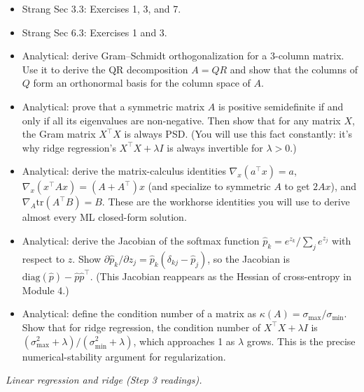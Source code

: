 \begin{itemize}
\tightlist
\item
  Strang Sec 3.3: Exercises 1, 3, and 7.
\item
  Strang Sec 6.3: Exercises 1 and 3.
\item
  Analytical: derive Gram--Schmidt orthogonalization for a 3-column
  matrix. Use it to derive the QR decomposition \(A = QR\) and show that
  the columns of \(Q\) form an orthonormal basis for the column space of
  \(A\).
\item
  Analytical: prove that a symmetric matrix \(A\) is positive
  semidefinite if and only if all its eigenvalues are non-negative. Then
  show that for any matrix \(X\), the Gram matrix \(X^\top X\) is always
  PSD. (You will use this fact constantly: it's why ridge regression's
  \(X^\top X + \lambda I\) is always invertible for \(\lambda > 0\).)
\item
  Analytical: derive the matrix-calculus identities
  \(\nabla_x (a^\top x) = a\),
  \(\nabla_x (x^\top A x) = (A + A^\top) x\) (and specialize to
  symmetric \(A\) to get \(2 A x\)), and
  \(\nabla_A \text{tr}(A^\top B) = B\). These are the workhorse
  identities you will use to derive almost every ML closed-form
  solution.
\item
  Analytical: derive the Jacobian of the softmax function
  \(\hat{p}_k = e^{z_k} / \sum_j e^{z_j}\) with respect to \(z\). Show
  \(\partial \hat{p}_k / \partial z_j = \hat{p}_k (\delta_{kj} - \hat{p}_j)\),
  so the Jacobian is \(\text{diag}(\hat{p}) - \hat{p}\hat{p}^\top\).
  (This Jacobian reappears as the Hessian of cross-entropy in Module 4.)
\item
  Analytical: define the condition number of a matrix as
  \(\kappa(A) = \sigma_{\max}/\sigma_{\min}\). Show that for ridge
  regression, the condition number of \(X^\top X + \lambda I\) is
  \((\sigma_{\max}^2 + \lambda)/(\sigma_{\min}^2 + \lambda)\), which
  approaches 1 as \(\lambda\) grows. This is the precise
  numerical-stability argument for regularization.
\end{itemize}

\emph{Linear regression and ridge (Step 3 readings).}

